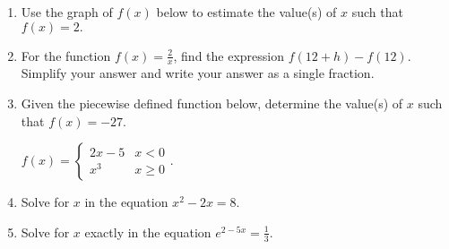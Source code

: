 \documentclass[12pt]{article}
\begin{document}
\begin{enumerate}
\quad \hfill \underline{\hspace{2in}}
\vfill

\item Use the graph of $f(x)$ below to estimate the value(s) of $x$ such that $f(x)=2.$

\quad \hfill \underline{\hspace{2in}}

\item For the function $f(x)=\frac{2}{x}$, find the expression $f(12+h)-f(12).$ Simplify your answer and write your answer as a single fraction.\\


\quad \hfill \underline{\hspace{2in}}
\vfill

\item Given the piecewise defined function below, determine the value(s) of $x$ such that $f(x)=-27.$

$f(x)=\begin{cases} 2x - 5 & x <0 \\ x^3 & x \geq 0 \end{cases}.$\\

\quad \hfill \underline{\hspace{2in}}
\vfill


\item Solve for $x$ in the equation $x^2-2x=8.$

\quad \hfill \underline{\hspace{2in}}
\vfill

\newpage
\item Solve for $x$ exactly in the equation $e^{2-5x}=\frac{1}{3}.$


\quad \hfill \underline{\hspace{2in}}
\vfill



\end{enumerate}
\end{document}
